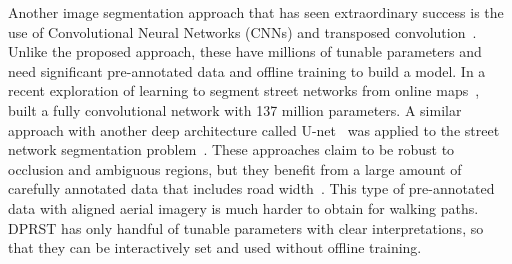 Another image segmentation approach that has seen extraordinary success is the use of Convolutional Neural Networks (CNNs) and transposed convolution~\cite{Badrinarayanan2017-il, Noh2015-ni, Shelhamer2017-rf, Ronneberger2015-sv}. 
Unlike the proposed approach, these have millions of tunable parameters and need significant pre-annotated data and offline training to build a model. 
In a recent exploration of learning to segment street networks from online maps~\cite{Kaiser2017-np}, built a fully convolutional network with 137 million parameters.
A similar approach with another deep architecture called U-net~\cite{Ronneberger2015-sv} was applied to the street network segmentation problem~\cite{Zhang2017-gi}.
These approaches claim to be robust to occlusion and ambiguous regions, but they benefit from a large amount of carefully annotated data that includes road width~\cite{Mnih2013-dp}. 
This type of pre-annotated data with aligned aerial imagery is much harder to obtain for walking paths. 
\ac{DPRST} has only handful of tunable parameters with clear interpretations, so that they can be interactively set and used without offline training.


